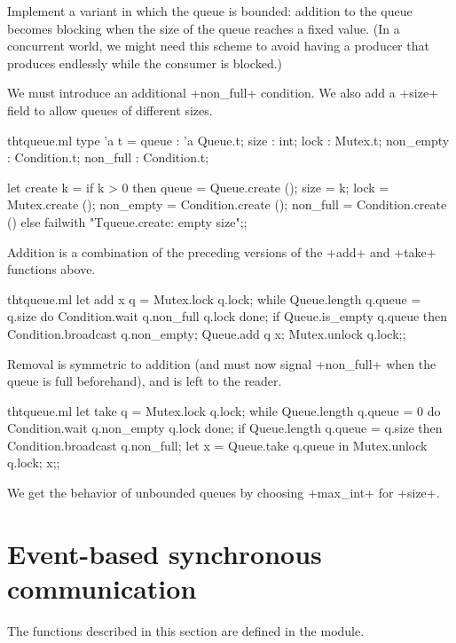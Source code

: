 \begin{exercise}
Implement a variant in which the queue is bounded: addition to the
queue becomes blocking when the size of the queue reaches a fixed
value. (In a concurrent world, we might need this scheme to avoid
having a producer that produces endlessly while the consumer is
blocked.)
\end{exercise}
\begin{answer}
We must introduce an additional \ml+non_full+ condition.
We also add a \ml+size+ field to allow queues of different sizes.
%
\begin{listingcodefile}{thtqueue.ml}
type 'a t = 
    { queue : 'a Queue.t; size : int; lock : Mutex.t;
      non_empty : Condition.t; non_full : Condition.t; }
      
let create k = 
  if  k > 0 then
    { queue = Queue.create (); size = k; lock = Mutex.create (); 
      non_empty = Condition.create (); non_full = Condition.create () }
  else failwith "Tqueue.create: empty size";;
\end{listingcodefile}
%
Addition is a combination of the preceding versions of the
\ml+add+ and \ml+take+ functions above.
%
\begin{listingcodefile}{thtqueue.ml}
let add x q = 
  Mutex.lock q.lock;
  while Queue.length q.queue = q.size 
  do Condition.wait q.non_full q.lock done;
  if Queue.is_empty q.queue then Condition.broadcast q.non_empty;
  Queue.add q x;
  Mutex.unlock q.lock;;
\end{listingcodefile}
%
Removal is symmetric to addition (and must now signal \ml+non_full+
when the queue is full beforehand), and is left to the reader.
%
\begin{codefile}{thtqueue.ml}
let take q = 
  Mutex.lock q.lock;
  while Queue.length q.queue = 0 
  do Condition.wait q.non_empty q.lock done;
  if Queue.length q.queue = q.size then Condition.broadcast q.non_full;
  let x = Queue.take q.queue in
  Mutex.unlock q.lock; x;;
\end{codefile}
%
We get the behavior of unbounded queues by choosing \ml+max_int+ for
\ml+size+.
\end{answer}



\section{Event-based synchronous communication}

The functions described in this section are defined in the
 module.

